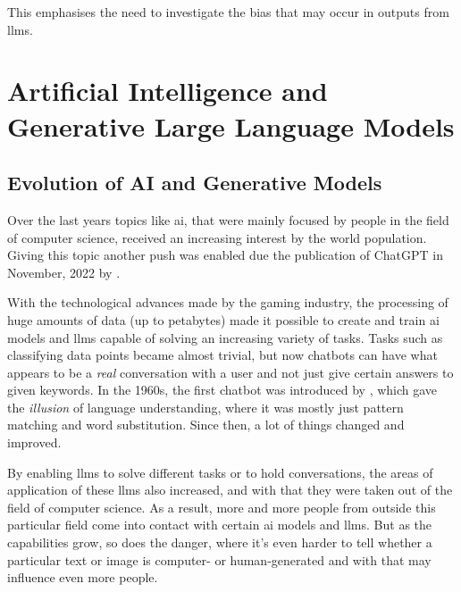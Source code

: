 This emphasises the need to investigate the bias that may occur in outputs from \acrshort{llms}. 

\section{Artificial Intelligence and Generative Large Language Models}

\subsection{Evolution of AI and Generative Models}
Over the last years topics like \acrshort{ai}, that were mainly focused by people in the field of computer science, received an increasing interest by the world population. Giving this topic another push was enabled due the publication of ChatGPT \citep{google-trends-ai} in November, 2022 by \citet{chatgpt-pub}. 

With the technological advances made by the gaming industry, the processing of huge amounts of data (up to petabytes) made it possible to create and train \acrshort{ai} models and \acrshort{llms} capable of solving an increasing variety of tasks. Tasks such as classifying data points became almost trivial, but now chatbots can have what appears to be a \textit{real} conversation with a user and not just give certain answers to given keywords. In the 1960s, the first chatbot was introduced by \citet{weizenbaum}, which gave the \textit{illusion} of language understanding, where it was mostly just pattern matching and word substitution. Since then, a lot of things changed and improved. 

By enabling \acrshort{llms} to solve different tasks or to hold conversations, the areas of application of these \acrshort{llms} also increased, and with that they were taken out of the field of computer science. As a result, more and more people from outside this particular field come into contact with certain \acrshort{ai} models and \acrshort{llms}. But as the capabilities grow, so does the danger, where it's even harder to tell whether a particular text or image is computer- or human-generated and with that may influence even more people.


